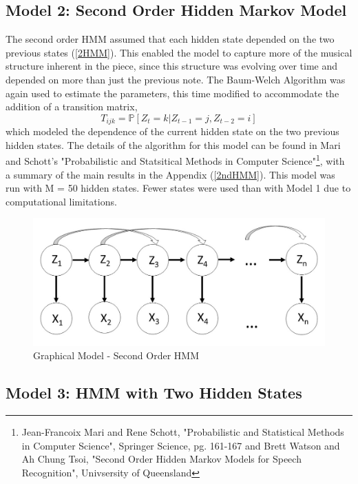 \documentclass{article} %
\begin{document}
\subsection{Model 2: Second Order Hidden Markov Model}

The second order HMM assumed that each hidden state  depended on the two previous  states (\autoref{2HMM}). This enabled the model to capture more of the musical structure inherent in the piece, since this structure was evolving over time and depended on more than just the previous note. The Baum-Welch Algorithm was again used to estimate the parameters, this time modified to accommodate the addition of a transition matrix, $$T_{ijk} = \mathbb{P}[Z_t = k | Z_{t-1} = j, Z_{t-2} = i]$$ which modeled the dependence of the current hidden state on the two previous hidden states. The details of the algorithm for this model can be found in Mari and Schott's "Probabilistic and Statsitical Methods in Computer Science"\footnote{Jean-Francoix Mari and Rene Schott, "Probabilistic and Statistical Methods in Computer Science", Springer Science, pg. 161-167 and Brett Watson and Ah Chung Tsoi, "Second Order Hidden Markov Models for Speech Recognition", Univsersity of Queensland}, with a summary of the main results in the Appendix (\autoref{2ndHMM}). This model was run with M = 50 hidden states. Fewer states were used than with Model 1 due to computational limitations.

\begin{figure}[H]
\centering

\includegraphics [scale = 0.35] {Model2.jpg}
\caption{Graphical Model - Second Order HMM\label{2HMM}}
\end{figure}

\subsection{Model 3: HMM with Two Hidden States}
\end{document}
